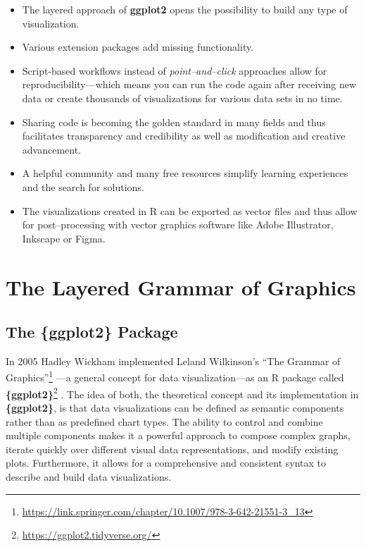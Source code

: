 \documentclass[
]{krantz}
\providecommand{\tightlist}{%
  \setlength{\itemsep}{0pt}\setlength{\parskip}{0pt}}
\renewcommand{\href}[2]{#2\footnote{\url{#1}}}
\begin{document}
\begin{itemize}
\tightlist
\item
  The layered approach of \textbf{ggplot2} opens the possibility to build any type of visualization.
\item
  Various extension packages add missing functionality.
\item
  Script-based workflows instead of \emph{point--and--click} approaches allow for reproducibility---which means you can run the code again after receiving new data or create thousands of visualizations for various data sets in no time.
\item
  Sharing code is becoming the golden standard in many fields and thus facilitates transparency and credibility as well as modification and creative advancement.
\item
  A helpful community and many free resources simplify learning experiences and the search for solutions.
\item
  The visualizations created in R can be exported as vector files and thus allow for post--processing with vector graphics software like Adobe Illustrator, Inkscape or Figma.
\end{itemize}

\hypertarget{the-layered-grammar-of-graphics}{%
\chapter{The Layered Grammar of Graphics}\label{the-layered-grammar-of-graphics}}

\hypertarget{ggplot}{%
\section{The \{ggplot2\} Package}\label{ggplot}}

In 2005 Hadley Wickham implemented Leland Wilkinson's \href{https://link.springer.com/chapter/10.1007/978-3-642-21551-3_13}{``The Grammar of Graphics''} \citep{wilkinson2005}---a general concept for data visualization---as an R package called \href{https://ggplot2.tidyverse.org/}{\textbf{\{ggplot2\}}} \citep{ggplot2}. The idea of both, the theoretical concept and its implementation in \textbf{\{ggplot2\}}, is that data visualizations can be defined as semantic components rather than as predefined chart types. The ability to control and combine multiple components makes it a powerful approach to compose complex graphs, iterate quickly over different visual data representations, and modify existing plots. Furthermore, it allows for a comprehensive and consistent syntax to describe and build data visualizations.
\end{document}
